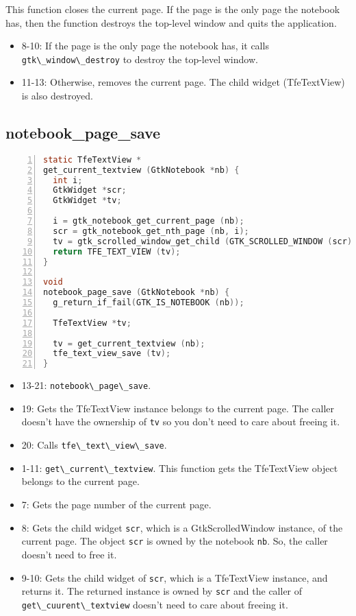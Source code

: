 This function closes the current page. If the page is the only page the
notebook has, then the function destroys the top-level window and quits
the application.

\begin{itemize}
\tightlist
\item
  8-10: If the page is the only page the notebook has, it calls
  \passthrough{\lstinline!gtk\_window\_destroy!} to destroy the
  top-level window.
\item
  11-13: Otherwise, removes the current page. The child widget
  (TfeTextView) is also destroyed.
\end{itemize}

\subsection{notebook\_page\_save}\label{notebook_page_save}

\begin{lstlisting}[language=C, numbers=left]
static TfeTextView *
get_current_textview (GtkNotebook *nb) {
  int i;
  GtkWidget *scr;
  GtkWidget *tv;

  i = gtk_notebook_get_current_page (nb);
  scr = gtk_notebook_get_nth_page (nb, i);
  tv = gtk_scrolled_window_get_child (GTK_SCROLLED_WINDOW (scr));
  return TFE_TEXT_VIEW (tv);
}

void
notebook_page_save (GtkNotebook *nb) {
  g_return_if_fail(GTK_IS_NOTEBOOK (nb));

  TfeTextView *tv;

  tv = get_current_textview (nb);
  tfe_text_view_save (tv);
}
\end{lstlisting}

\begin{itemize}
\tightlist
\item
  13-21: \passthrough{\lstinline!notebook\_page\_save!}.
\item
  19: Gets the TfeTextView instance belongs to the current page. The
  caller doesn't have the ownership of \passthrough{\lstinline!tv!} so
  you don't need to care about freeing it.
\item
  20: Calls \passthrough{\lstinline!tfe\_text\_view\_save!}.
\item
  1-11: \passthrough{\lstinline!get\_current\_textview!}. This function
  gets the TfeTextView object belongs to the current page.
\item
  7: Gets the page number of the current page.
\item
  8: Gets the child widget \passthrough{\lstinline!scr!}, which is a
  GtkScrolledWindow instance, of the current page. The object
  \passthrough{\lstinline!scr!} is owned by the notebook
  \passthrough{\lstinline!nb!}. So, the caller doesn't need to free it.
\item
  9-10: Gets the child widget of \passthrough{\lstinline!scr!}, which is
  a TfeTextView instance, and returns it. The returned instance is owned
  by \passthrough{\lstinline!scr!} and the caller of
  \passthrough{\lstinline!get\_cuurent\_textview!} doesn't need to care
  about freeing it.
\end{itemize}

